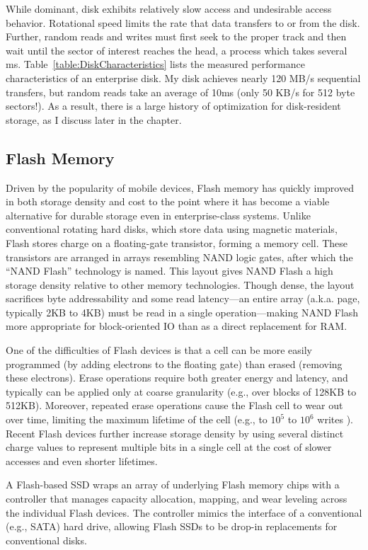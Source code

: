 While dominant, disk exhibits relatively slow access and undesirable access behavior.
Rotational speed limits the rate that data transfers to or from the disk.
Further, random reads and writes must first seek to the proper track and then wait until the sector of interest reaches the head, a process which takes several ms.
Table~\ref{table:DiskCharacteristics} lists the measured performance characteristics of an enterprise disk.
My disk achieves nearly 120 MB/s sequential transfers, but random reads take an average of 10ms (only 50 KB/s for 512 byte sectors!).
As a result, there is a large history of optimization for disk-resident storage, as I discuss later in the chapter.

\subsection{Flash Memory}
\label{sec:Background:Flash}
Driven by the popularity of mobile devices, Flash memory has quickly improved in both storage density and cost to the point where it has become a viable alternative for durable storage even in enterprise-class systems.
Unlike conventional rotating hard disks, which store data using magnetic materials, Flash stores charge on a floating-gate transistor, forming a memory cell.
These transistors are arranged in arrays resembling NAND logic gates, after which the ``NAND Flash'' technology is named.
This layout gives NAND Flash a high storage density relative to other memory technologies.
Though dense, the layout sacrifices byte addressability and some read latency---an entire array (a.k.a. page, typically 2KB to 4KB) must be read in a single operation---making NAND Flash more appropriate for block-oriented IO than as a direct replacement for RAM.  

One of the difficulties of Flash devices is that a cell can be more easily programmed (by adding electrons to the floating gate) than erased (removing these electrons).  
Erase operations require both greater energy and latency, and typically can be applied only at coarse granularity (e.g., over blocks of 128KB to 512KB).
Moreover, repeated erase operations cause the Flash cell to wear out over time, limiting the maximum lifetime of the cell (e.g., to $10^5$ to $10^6$ writes ).  
Recent Flash devices further increase storage density by using several distinct charge values to represent multiple bits in a single cell at the cost of slower accesses and even shorter lifetimes.

A Flash-based SSD wraps an array of underlying Flash memory chips with a controller that manages capacity allocation, mapping, and wear leveling across the individual Flash devices.  
The controller mimics the interface of a conventional (e.g., SATA) hard drive, allowing Flash SSDs to be drop-in replacements for conventional disks.
      

